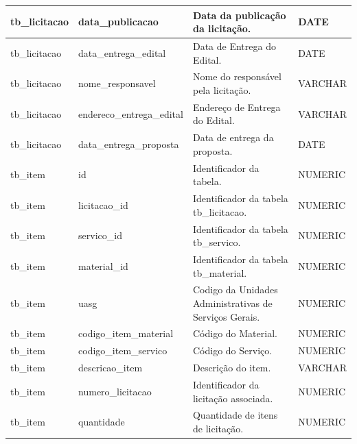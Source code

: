 \begin{landscape}
\begin{table}[ht]
\begin{tabular}{|l|l|l|l|}
	tb\_licitacao  & data\_publicacao          & Data da publicação da licitação.                                       & DATE         \\ \hline
	tb\_licitacao  & data\_entrega\_edital     & Data de Entrega do Edital.                                             & DATE         \\ \hline
	tb\_licitacao  & nome\_responsavel         & Nome do responsável pela licitação.                                    & VARCHAR      \\ \hline
	tb\_licitacao  & endereco\_entrega\_edital & Endereço de Entrega do Edital.                                         & VARCHAR      \\ \hline
	tb\_licitacao  & data\_entrega\_proposta   & Data de entrega da proposta.                                           & DATE         \\ \hline
	tb\_item       & id                        & Identificador da tabela.                                               & NUMERIC      \\ \hline
	tb\_item       & licitacao\_id             & Identificador da tabela tb\_licitacao.                                 & NUMERIC      \\ \hline
	tb\_item       & servico\_id               & Identificador da tabela tb\_servico.                                   & NUMERIC      \\ \hline
	tb\_item       & material\_id              & Identificador da tabela tb\_material.                                  & NUMERIC      \\ \hline
	tb\_item       & uasg                      & Codigo da Unidades Administrativas de Serviços Gerais.                 & NUMERIC      \\ \hline
	tb\_item       & codigo\_item\_material    & Código do Material.                                                    & NUMERIC      \\ \hline
	tb\_item       & codigo\_item\_servico     & Código do Serviço.                                                     & NUMERIC      \\ \hline
	tb\_item       & descricao\_item           & Descrição do item.                                                     & VARCHAR      \\ \hline
	tb\_item       & numero\_licitacao         & Identificador da licitação associada.                                  & NUMERIC      \\ \hline
	tb\_item       & quantidade                & Quantidade de itens de licitação.                                      & NUMERIC      \\ \hline

\end{tabular}
\end{table}
\end{landscape}
